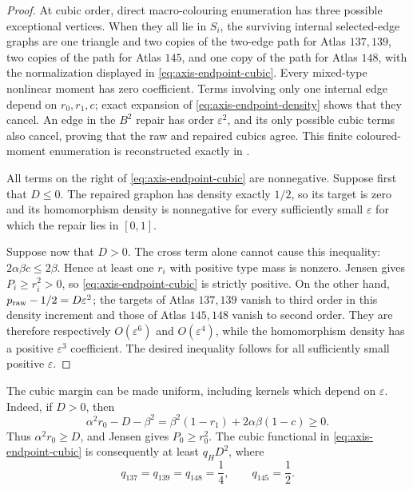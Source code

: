 \documentclass[11pt]{article}
\begin{document}
\begin{proof}
At cubic order, direct macro-colouring enumeration has three possible
exceptional vertices.  When they all lie in $S_i$, the surviving internal
selected-edge graphs are one triangle and two copies of the two-edge path
for Atlas $137,139$, two copies of the path for Atlas $145$, and one copy of
the path for Atlas $148$, with the normalization displayed in
\eqref{eq:axis-endpoint-cubic}.  Every mixed-type nonlinear moment has zero
coefficient.  Terms involving only one internal edge depend on
$r_0,r_1,c$; exact expansion of
\eqref{eq:axis-endpoint-density} shows that they cancel.  An edge in the
$B^2$ repair has order $\varepsilon^2$, and its only possible cubic terms
also cancel, proving that the raw and repaired cubics agree.  This finite
coloured-moment enumeration is reconstructed exactly in
.

All terms on the right of \eqref{eq:axis-endpoint-cubic} are nonnegative.
Suppose first that $D\leq0$.  The repaired graphon has density exactly
$1/2$, so its target is zero and its homomorphism density is nonnegative for
every sufficiently small $\varepsilon$ for which the repair lies in
$[0,1]$.

Suppose now that $D>0$.  The cross term alone cannot cause this inequality:
$2\alpha\beta c\leq2\beta$.  Hence at least one $r_i$ with positive type
mass is nonzero.  Jensen gives $P_i\geq r_i^2>0$, so
\eqref{eq:axis-endpoint-cubic} is strictly positive.  On the other hand,
$p_{\rm raw}-1/2=D\varepsilon^2$; the targets of Atlas $137,139$ vanish to
third order in this density increment and those of Atlas $145,148$ vanish
to second order.  They are therefore respectively $O(\varepsilon^6)$ and
$O(\varepsilon^4)$, while the homomorphism density has a positive
$\varepsilon^3$ coefficient.  The desired inequality follows for all
sufficiently small positive $\varepsilon$.
\end{proof}

The cubic margin can be made uniform, including kernels which depend on
$\varepsilon$.  Indeed, if $D>0$, then
\begin{equation}
 \alpha^2r_0-D-\beta^2
 =\beta^2(1-r_1)+2\alpha\beta(1-c)\geq0.
 \label{eq:axis-endpoint-density-coercivity}
\end{equation}
Thus $\alpha^2r_0\geq D$, and Jensen gives
$P_0\geq r_0^2$.  The cubic functional in
\eqref{eq:axis-endpoint-cubic} is consequently at least $q_HD^2$, where
\[
 q_{137}=q_{139}=q_{148}=\frac14,
 \qquad q_{145}=\frac12.
\]
\end{document}
